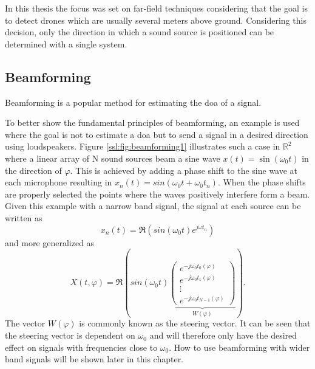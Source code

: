 In this thesis the focus was set on far-field techniques considering that the
goal is to detect drones which are usually several meters above ground.
Considering this decision, only the direction in which a sound source is positioned
can be determined with a single system.

\subsection{Beamforming}
Beamforming is a popular method for estimating the \acrshort{doa} of a signal.

To better show the fundamental principles of beamforming, an example is used
where the goal is not to estimate a \acrshort{doa} but to send a signal
in a desired direction using loudspeakers.
Figure \ref{ssl:fig:beamforming1} illustrates such a case in $\mathbb{R}^2$
where a linear array of N sound sources beam a sine wave $x(t) = \sin(\omega_0 t)$ 
in the direction of $\varphi$.
This is achieved by adding a phase shift to the sine wave
at each microphone resulting in $x_n(t) = sin(\omega_0 t + \omega_0t_n)$.
When the phase shifts are properly selected the points where the waves positively
interfere form a beam.
Given this example with a narrow band signal, the signal at each source
can be written as
\begin{equation}
	x_n(t) = \Re(sin(\omega_0 t) e^{j\omega t_n})
\end{equation}
and more generalized as 
\begin{equation}
  \label{ssl:eq:beamSteerOut}
  X(t, \varphi) = 
  \Re\left(
    sin(\omega_0 t)
    \underbrace{
      \begin{pmatrix} 
        e^{-j\omega_0 t_0(\varphi)} \\ 
        e^{-j\omega_0 t_1(\varphi)} \\
        \vdots \\ 
        e^{-j\omega_0 t_{N-1}(\varphi)} 
      \end{pmatrix}}_{W(\varphi)}
  \right).
\end{equation}
The vector $W(\varphi)$ is commonly known as the steering vector.
It can be seen that the steering vector is dependent on $\omega_0$ and 
will therefore only have the desired effect on signals with frequencies 
close to $\omega_0$.
How to use beamforming with wider band signals will be shown later in this chapter.
